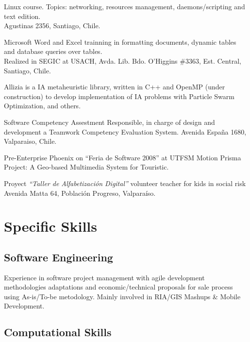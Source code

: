 \documentclass[11pt,letterpaper,roman]{moderncv}
\begin{document}
	 {\tchr} {\ipgamma} {\stgo} {}
	{\sence Linux course. Topics: networking, resources management,
	daemons/scripting and text edition.\\ Agustinas 2356, Santiago, Chile.}

	 {\tchr} {\otecnewline} {\stgo} {}
	{\sence Microsoft Word and Excel trainning in formatting documents,
	dynamic tables and database queries over tables. \\
	Realized in SEGIC at USACH, Avda. Lib. Bdo. O'Higgins \#3363, Est.
	Central, Santiago, Chile.}

	
	{Allizia is a IA metaheuristic library, written in C++ and OpenMP (under
	construction) to develop implementation of IA problems with Particle Swarm Optimization, and others.}

	 { } {} {}
	{Software Competency Assestment Responsible, in charge of design
	and development a Teamwork Competency Evaluation System. Avenida Espa\~na 1680,
	Valparaiso, Chile.}

	 {\sd} { } {} {}
	{Pre-Enterprise Phoenix on ``Feria de Software 2008'' at \textsc{UTFSM}
	Motion Prisma Project: A Geo-based Multimedia System for Touristic.}

	 {\tchr} {\ernestoquiroz } {\valpo} {}
	{Proyect \textit{``Taller de Alfabetizaci\'on Digital''} volunteer
	teacher for kids in social risk Avenida Matta 64, Poblaci\'on Progreso,
	Valpara\'iso.}
	
\section{Specific Skills}
	\subsection{Software Engineering}
		{Experience in software project management with agile development
		methodologies adaptations and economic/technical proposals for sale process
		using As-is/To-be metodology. Mainly involved in RIA/GIS Mashups \& Mobile Development.}
		
	\subsection{Computational Skills}
\end{document}
